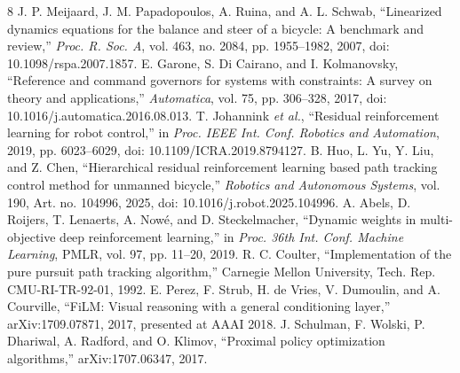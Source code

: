 \begin{thebibliography}{8}
 J. P. Meijaard, J. M. Papadopoulos, A. Ruina, and A. L. Schwab, ``Linearized dynamics equations for the balance and steer of a bicycle: A benchmark and review,'' \emph{Proc. R. Soc. A}, vol. 463, no. 2084, pp. 1955--1982, 2007, doi: 10.1098/rspa.2007.1857.
 E. Garone, S. Di Cairano, and I. Kolmanovsky, ``Reference and command governors for systems with constraints: A survey on theory and applications,'' \emph{Automatica}, vol. 75, pp. 306--328, 2017, doi: 10.1016/j.automatica.2016.08.013.
 T. Johannink \emph{et al.}, ``Residual reinforcement learning for robot control,'' in \emph{Proc. IEEE Int. Conf. Robotics and Automation}, 2019, pp. 6023--6029, doi: 10.1109/ICRA.2019.8794127.
 B. Huo, L. Yu, Y. Liu, and Z. Chen, ``Hierarchical residual reinforcement learning based path tracking control method for unmanned bicycle,'' \emph{Robotics and Autonomous Systems}, vol. 190, Art. no. 104996, 2025, doi: 10.1016/j.robot.2025.104996.
 A. Abels, D. Roijers, T. Lenaerts, A. Now\'{e}, and D. Steckelmacher, ``Dynamic weights in multi-objective deep reinforcement learning,'' in \emph{Proc. 36th Int. Conf. Machine Learning}, PMLR, vol. 97, pp. 11--20, 2019.
 R. C. Coulter, ``Implementation of the pure pursuit path tracking algorithm,'' Carnegie Mellon University, Tech. Rep. CMU-RI-TR-92-01, 1992.
 E. Perez, F. Strub, H. de Vries, V. Dumoulin, and A. Courville, ``FiLM: Visual reasoning with a general conditioning layer,'' arXiv:1709.07871, 2017, presented at AAAI 2018.
 J. Schulman, F. Wolski, P. Dhariwal, A. Radford, and O. Klimov, ``Proximal policy optimization algorithms,'' arXiv:1707.06347, 2017.
\end{thebibliography}
